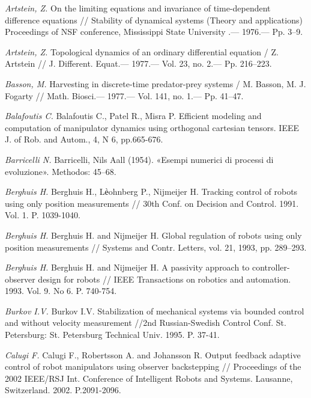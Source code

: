 \begin{thebibliography}{10}
	{\it Artstein, Z.} On the limiting equations and invariance of time-dependent difference equations // Stability of dynamical systems (Theory and applications) Proceedings of NSF conference, Mississippi State University .— 1976.— Pp. 3–9.
	
	{\it Artstein, Z.} Topological dynamics of an ordinary differential equation / Z. Artstein // J.
	Different. Equat.— 1977.— Vol. 23, no. 2.— Pp. 216–223.
	
	{\it Basson, M.} Harvesting in discrete-time predator-prey systems / M. Basson, M. J. Fogarty // Math. Biosci.— 1977.— Vol. 141, no. 1.— Pp. 41–47.
	
	{\it Balafoutis C.} Balafoutis C., Patel R., Misra P. Efficient modeling and computation of manipulator dynamics using orthogonal cartesian tensors. IEEE J. of Rob. and Autom., 4, N 6, pp.665-676.
	
	{\it Barricelli N.} Barricelli, Nils Aall (1954). «Esempi numerici di processi di evoluzione». Methodos: 45–68.
	
	{\it Berghuis H.} Berghuis H., Lѐohnberg P., Nijmeijer H. Tracking control of robots using only position measurements // 30th Conf. on Decision and Control. 1991. Vol. 1. P. 1039-1040.
	
	{\it Berghuis H.} Berghuis H. and Nijmeijer H. Global regulation of robots using only position measurements // Systems and Contr. Letters, vol. 21, 1993, pp. 289–293. 
	
	{\it Berghuis H.} Berghuis H. and Nijmeijer H. A passivity approach to controller-observer design for robots // IEEE Transactions on robotics and automation. 1993. Vol. 9. No 6. P. 740-754.
	
	{\it Burkov I.V.} Burkov I.V. Stabilization of mechanical systems via bounded control and without velocity measurement //2nd Russian-Swedish Control Conf. St. Petersburg: St. Petersburg Technical Univ. 1995. P. 37-41.
	
	{\it Calugi F.} Calugi F., Robertsson A. and Johansson R. Output feedback adaptive control of robot manipulators using observer backstepping // Proceedings of the 2002 IEEE/RSJ Int. Conference of Intelligent Robots and Systems. Lausanne, Switzerland. 2002. P.2091-2096.
	

\end{thebibliography}
